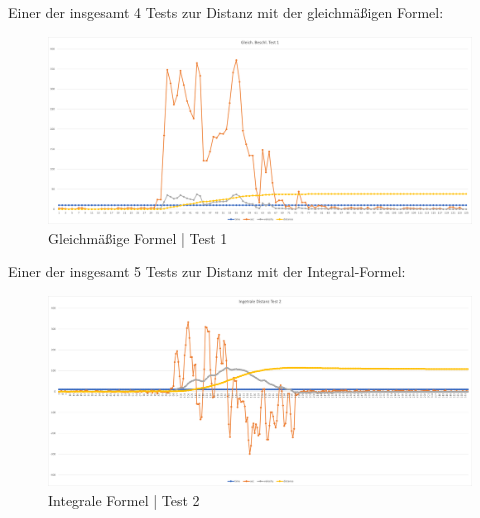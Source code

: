 Einer der insgesamt 4 Tests zur Distanz mit der gleichmäßigen Formel:

\begin{figure} [h]
\centering
\includegraphics[width = 15cm]{Bilder/constDistance1}
\caption{Gleichmäßige Formel | Test 1}
\label{fig:wo-bin-ich}
\end{figure}

Einer der insgesamt 5 Tests zur Distanz mit der Integral-Formel:

\begin{figure} [h]
    \centering
    \includegraphics[width = 15cm]{Bilder/integralDistance2}
    \caption{Integrale Formel | Test 2}
    \label{fig:wo-bin-ich}
    \end{figure}